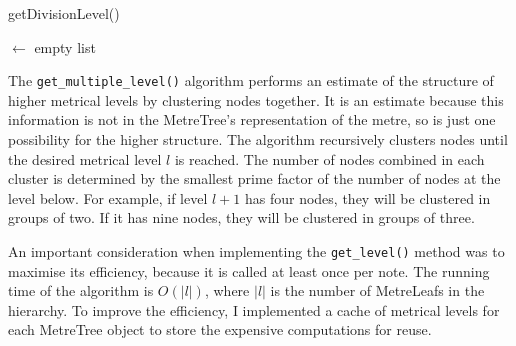 \documentclass[12pt,twoside,openright]{report}
\begin{document}
\begin{algorithm}[H]

    \caption{getDivisionLevel()}
    \BlankLine

    \NewSequence $\gets$ empty list\;
    \label{alg:getDivisionLevel}
\end{algorithm}

The \verb'get_multiple_level()' algorithm performs an estimate of the structure of
higher metrical levels by clustering nodes together. It is an estimate because this information is not in the
MetreTree's representation of the metre, so is just one possibility for the higher structure. The algorithm recursively clusters nodes until
the desired metrical level $l$ is reached. The number of nodes combined in each cluster is
determined by the smallest prime factor of the number of nodes at the level below. For
example, if level $l+1$ has four nodes, they will be clustered in groups of two. If it
has nine nodes, they will be clustered in groups of three.

An important consideration when implementing the \verb'get_level()' method was to
maximise its efficiency, because it is called at least once per note. The
running time of the algorithm is $O(\left\lvert l\right\rvert)$, where $\left\lvert l\right\rvert$ is the number of MetreLeafs in the
hierarchy. To improve the efficiency, I implemented a cache of metrical levels for each
MetreTree object to store the expensive computations for reuse.
\end{document}
